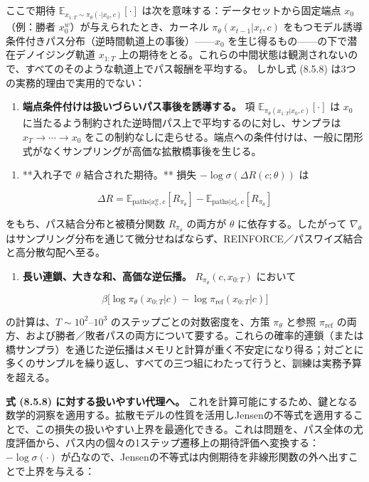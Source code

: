 ここで期待 $\mathbb{E}_{x_{1:T}\sim\pi_\theta(\cdot|x_0,c)}[\cdot]$ は次を意味する：データセットから固定端点 $x_0$（例：勝者 $x_0^w$）が与えられたとき、カーネル $\pi_\theta(x_{t-1}|x_t,c)$ をもつモデル誘導条件付きパス分布（逆時間軌道上の事後）——$x_0$ を生じ得るもの——の下で潜在デノイジング軌道 $x_{1:T}$ 上の期待をとる。これらの中間状態は観測されないので、すべてのそのような軌道上でパス報酬を平均する。
しかし式 (8.5.8) は3つの実務的理由で実用的でない：

\begin{enumerate}
\item \textbf{端点条件付けは扱いづらいパス事後を誘導する。} 項 $\mathbb{E}_{\pi_\theta(x_{1:T}|x_0,c)}[\cdot]$ は $x_0$ に当たるよう制約された逆時間パス上で平均するのに対し、サンプラは $x_T\to\cdots\to x_0$ をこの制約なしに走らせる。端点への条件付けは、一般に閉形式がなくサンプリングが高価な拡散橋事後を生じる。
\end{enumerate}


\begin{enumerate}
\item **入れ子で $\theta$ 結合された期待。** 損失 $-\log\sigma(\Delta R(c;\theta))$ は
\end{enumerate}

\[
\Delta R=\mathbb{E}_{\mathrm{paths}|x_0^w,c}[R_{\pi_\theta}]-\mathbb{E}_{\mathrm{paths}|x_0^l,c}[R_{\pi_\theta}]
\]

   をもち、パス結合分布と被積分関数 $R_{\pi_\theta}$ の両方が $\theta$ に依存する。したがって $\nabla_\theta$ はサンプリング分布を通じて微分せねばならず、REINFORCE／パスワイズ結合と高分散勾配へ至る。

\begin{enumerate}
\item \textbf{長い連鎖、大きな和、高価な逆伝播。} $R_{\pi_\theta}(c,x_{0:T})$ において
\end{enumerate}

\[
\beta\bigl[\log\pi_\theta(x_{0:T}|c)-\log\pi_{\mathrm{ref}}(x_{0:T}|c)\bigr]
\]

   の計算は、$T\sim 10^2$–$10^3$ のステップごとの対数密度を、方策 $\pi_\theta$ と参照 $\pi_{\mathrm{ref}}$ の両方、および勝者／敗者パスの両方について要する。これらの確率的連鎖（または橋サンプラ）を通じた逆伝播はメモリと計算が重く不安定になり得る；対ごとに多くのサンプルを繰り返し、すべての三つ組にわたって行うと、訓練は実務予算を超える。

\textbf{式 (8.5.8) に対する扱いやすい代理へ。} これを計算可能にするため、鍵となる数学的洞察を適用する。拡散モデルの性質を活用しJensenの不等式を適用することで、この損失の扱いやすい上界を最適化できる。これは問題を、パス全体の尤度評価から、パス内の個々の1ステップ遷移上の期待評価へ変換する：
$-\log\sigma(\cdot)$ が凸なので、Jensenの不等式は内側期待を非線形関数の外へ出すことで上界を与える：

